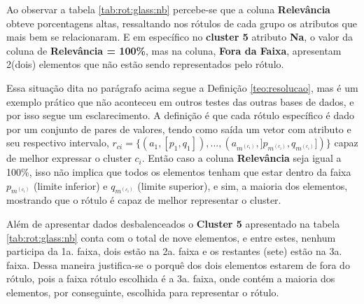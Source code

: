 Ao observar a tabela \ref{tab:rot:glass:nb} percebe-se que a coluna \textbf{Relevância} obteve porcentagens altas, ressaltando nos rótulos de cada grupo os atributos que mais bem se relacionaram. E em específico no  \textbf{cluster 5} atributo \textbf{Na}, o valor da coluna de \textbf{Relevância = 100\%}, mas na coluna, \textbf{Fora da Faixa}, apresentam 2(dois) elementos que não estão sendo representados pelo rótulo. 

Essa situação dita no parágrafo acima segue a Definição \ref{teo:resolucao}, mas é um exemplo prático que não aconteceu em outros testes das outras bases de dados, e por isso segue um esclarecimento. A definição é que cada rótulo específico é dado por um conjunto de pares de valores, tendo como saída um vetor com atributo e seu respectivo intervalo, ${ r_{ci}=\{ (a_1,[p_1,q_1]),...,(a_{m^{(c_i)}}, ]p_{m^{(c_i)}},q_{m^{(c_i)}}]) \} }$ capaz de melhor expressar o cluster ${c_i}$. Então caso a coluna \textbf{Relevância} seja igual a 100\%, isso não implica que todos os elementos tenham que estar dentro da faixa ${ p_{m^{(c_i)}} }$ (limite inferior) e ${ q_{m^{(c_i)}} }$ (limite superior), e sim, a maioria dos elementos, mostrando que o rótulo é capaz de melhor representar o cluster.

Além de apresentar dados desbalenceados o \textbf{Cluster 5} apresentado na tabela \ref{tab:rot:glass:nb} conta com o total de nove elementos, e entre estes, nenhum participa da 1a. faixa, dois estão na 2a. faixa e os restantes (sete) estão na 3a. faixa. Dessa maneira justifica-se o porquê dos dois elementos estarem de fora do rótulo, pois a faixa rótulo escolhida é a 3a. faixa, onde contém a maioria dos elementos, por conseguinte, escolhida para representar o rótulo.

